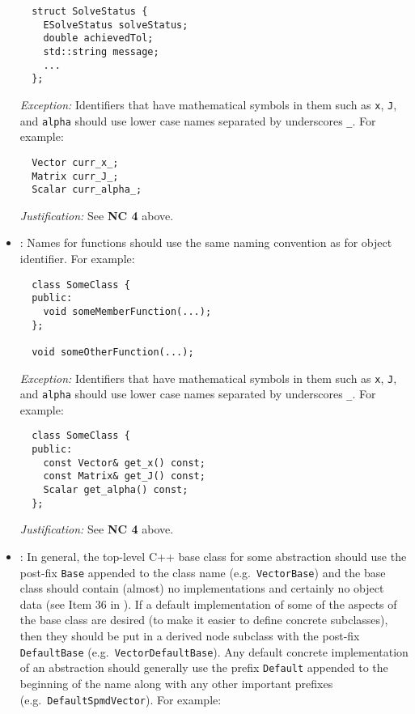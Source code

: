 \begin{itemize}
{\small\begin{verbatim}
  struct SolveStatus {
    ESolveStatus solveStatus;
    double achievedTol;
    std::string message;
    ...
  };
\end{verbatim}}


{}\textit{Exception:} Identifiers that have mathematical symbols in them such
as {}\texttt{x}, {}\texttt{J}, and {}\texttt{alpha} should use lower case
names separated by underscores {}\texttt{\_}.  For example:

{\small\begin{verbatim}
  Vector curr_x_;
  Matrix curr_J_;
  Scalar curr_alpha_;
\end{verbatim}}

{}\textit{Justification:} See {}\textbf{NC 4} above.


{}\item\NCFunctionNames: Names for functions should use the same naming
convention as for object identifier.  For example:

{\small\begin{verbatim}
  class SomeClass {
  public:
    void someMemberFunction(...);
  };

  void someOtherFunction(...);
\end{verbatim}}


{}\textit{Exception:} Identifiers that have mathematical symbols in them such
as {}\texttt{x}, {}\texttt{J}, and {}\texttt{alpha} should use lower case
names separated by underscores {}\texttt{\_}.  For example:

{\small\begin{verbatim}
  class SomeClass {
  public:
    const Vector& get_x() const;
    const Matrix& get_J() const;
    Scalar get_alpha() const;
  };
\end{verbatim}}


{}\textit{Justification:} See {}\textbf{NC 4} above.


{}\item\NCBaseDefaultClassNames: In general, the top-level C++ base class for
some abstraction should use the post-fix {}\texttt{Base} appended to the class
name (e.g.\ {}\texttt{Vector\-Base}) and the base class should contain
(almost) no implementations and certainly no object data (see Item 36 in
{}\cite{C++CodingStandards05}).  If a default implementation of some of the
aspects of the base class are desired (to make it easier to define concrete
subclasses), then they should be put in a derived node subclass with the
post-fix {}\texttt{DefaultBase} (e.g.\ {}\texttt{Vector\-Default\-Base}).  Any
default concrete implementation of an abstraction should generally use the
prefix {}\texttt{Default} appended to the beginning of the name along with any
other important prefixes (e.g.\ {}\texttt{DefaultSpmdVector}).  For example:


\end{itemize}
